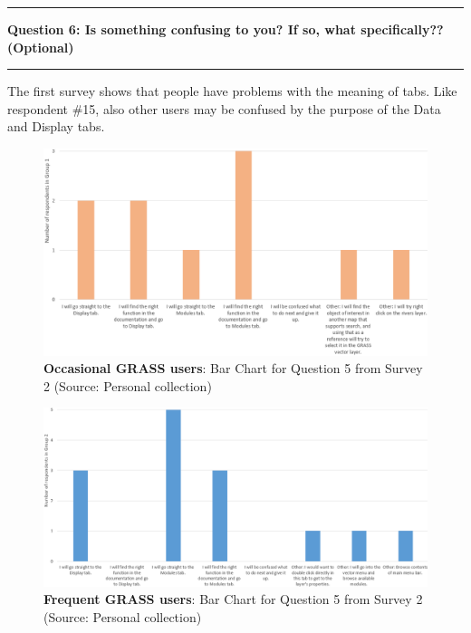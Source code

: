 \documentclass[a4paper,10pt,twoside]{article}
\begin{document}
\par\noindent\rule{\textwidth}{0.4pt}
\noindent \textbf{Question 6: Is something confusing to you? If so, what specifically?? (Optional)}
\par\noindent\rule{\textwidth}{0.4pt}

\noindent The first survey shows that people have problems with the
meaning of tabs. Like respondent \#15, also other users may be confused 
by the purpose of the Data and Display tabs.

\vspace{0.3cm}
\begin{figure}[hbt!] 
\begin{center}
\includegraphics[width=17cm]{../surveys/analyzed_data/survey2_question5_histogram_group1.png} 
\caption[\textbf{Occasional GRASS users}: Bar Chart for Question 5 from Survey 2]{\textbf{Occasional GRASS users}: Bar Chart for Question 5 from Survey 2 (Source: Personal collection)}
\label{fig:survey2_question5_histogram_group1}
\end{center}
\end{figure}

\newpage
\begin{figure}[hbt!] 
\begin{center}
\includegraphics[width=17cm]{../surveys/analyzed_data/survey2_question5_histogram_group2.png} 
\caption[\textbf{Frequent GRASS users}: Bar Chart for Question 5 from Survey 2]{\textbf{Frequent GRASS users}: Bar Chart for Question 5 from Survey 2 (Source: Personal collection)}
\label{fig:survey2_question5_histogram_group2}
\end{center}
\end{figure}
\end{document}
